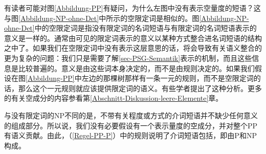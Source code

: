 有读者可能对图\ref{Abbildung-PP}有疑问，为什么左图中没有表示空量度的短语？这与图\ref{Abbildung-NP-ohne-Det}中所示的空限定词是相似的。图\ref{Abbildung-NP-ohne-Det}中的空限定词是指没有限定词的名词短语与有限定词的名词短语表示的意义是一样的。通常由可见的限定词表示的意义以某种方式整合进名词短语的结构之中了。如果我们在空限定词中没有表示这层意思的话，将会导致有关语义整合的更为复杂的问题：我们只是需要了解\ref{sec-PSG-Semantik}表示的机制，而且这些信息是比较普遍的。意义是由这些词本身决定的，而不是由规则决定的。如果我们假设在图\ref{Abbildung-PP}中左边的那棵树那样有一条一元的规则，而不是空限定词的话，那么这个一元规则就应该提供限定词的语义。有些学者提出了这种分析。更多的有关空成分的内容参看第\ref{Abschnitt-Diskussion-leere-Elemente}章。

与没有限定词的NP不同的是，不带有关程度或方式的介词短语并不缺少任何意义的组成部分。所以说，我们没有必要假设有一个表示量度的空成分，并对整个PP有语义贡献。由此，（\ref{Regel-PP-P}）中的规则说明了介词短语包括\pbarc，即由P和NP构成。

